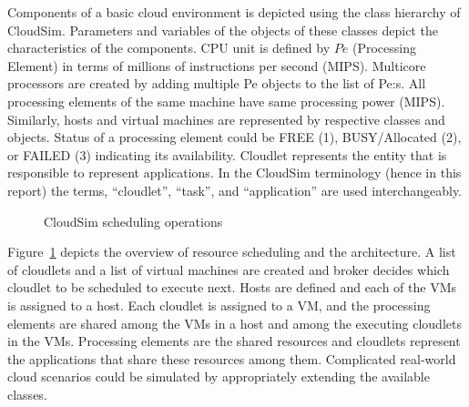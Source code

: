 \documentclass[times, 10pt,twocolumn]{article}
\begin{document}
Components of a basic cloud environment is depicted using the class hierarchy of CloudSim. Parameters and variables of the objects of these classes depict the characteristics of the components. CPU unit is defined by $Pe$ (Processing Element) in terms of millions of instructions per second (MIPS). Multicore processors are created by adding multiple Pe objects to the list of Pe:s. All processing elements of the same machine have same processing power (MIPS). Similarly, hosts and virtual machines are represented by respective classes and objects. Status of a processing element could be FREE (1), BUSY/Allocated (2), or FAILED (3) indicating its availability. Cloudlet represents the entity that is responsible to represent applications. In the CloudSim terminology (hence in this report) the terms, ``cloudlet'', ``task'', and ``application'' are used interchangeably. 
\begin{figure}[ht]
 \caption{CloudSim scheduling operations}
 \label{fig:scheduling}
\end{figure}
Figure~\ref{fig:scheduling} depicts the overview of resource scheduling and the architecture. A list of cloudlets and a list of virtual machines are created and broker decides which cloudlet to be scheduled to execute next. Hosts are defined and each of the VMs is assigned to a host. Each cloudlet is assigned to a VM, and the processing elements are shared among the VMs in a host and among the executing cloudlets in the VMs. Processing elements are the shared resources and cloudlets represent the applications that share these resources among them. Complicated real-world cloud scenarios could be simulated by appropriately extending the available classes.
\end{document}
